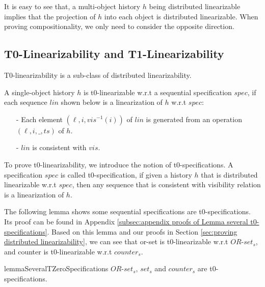 It is easy to see that, a multi-object history $h$ being distributed linearizable implies that the projection of $h$ into each object is distributed linearizable. When proving compositionality, we only need to consider the opposite direction.




\subsection{T0-Linearizability and T1-Linearizability}
\label{subsec:t0-linearizability and t1-linearizability}

T0-linearizability is a sub-class of distributed linearizability.

\begin{definition}[t0-linearizability]
\label{definition:t0-ilnearizability}
A single-object history $h$ is t0-linearizable w.r.t a sequential specification $\mathit{spec}$, if each sequence $\mathit{lin}$ shown below is a linearization of $h$ w.r.t $\mathit{spec}$:

\begin{itemize}
\setlength{\itemsep}{0.5pt}
\item[-] Each element $(\ell,i,\mathit{vis}^{-1}(i))$ of $\mathit{lin}$ is generated from an operation $(\ell,i,\_,\mathit{ts})$ of $h$.

\item[-] $\mathit{lin}$ is consistent with $\mathit{vis}$.
\end{itemize}
\end{definition}

To prove t0-linearizability, we introduce the notion of t0-specifications. A specification $\mathit{spec}$ is called t0-specification, if given a history $h$ that is distributed linearizable w.r.t $\mathit{spec}$, then any sequence that is consistent with visibility relation is a linearization of $h$.

The following lemma shows some sequential specifications are t0-specifications. Its proof can be found in Appendix \ref{subsec:appendix proofs of Lemma several t0-specifications}. Based on this lemma and our proofs in Section \ref{sec:proving distributed linearizability}, we can see that or-set is t0-linearizable w.r.t $\mathit{OR}$-$\mathit{set}_s$, and counter is t0-linearizable w.r.t $\mathit{counter}_s$.

\begin{restatable}{lemma}{SeveralTZeroSpecifications}
\label{lemma:several t0-specifications}
$\mathit{OR}$-$\mathit{set}_s$, $\mathit{set}_s$ and $\mathit{counter}_s$ are t0-specifications.
\end{restatable}



